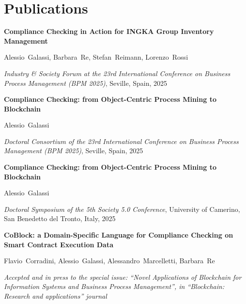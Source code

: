 \section{Publications}

    \begin{onecolentry}
        \textbf{Compliance Checking in Action for INGKA Group Inventory Management}
        
        \mbox{Alessio Galassi}, \mbox{Barbara Re}, \mbox{Stefan Reimann}, \mbox{Lorenzo Rossi}

        \textit{Industry \& Society Forum at the 23rd International Conference on Business Process Management (BPM 2025)}, Seville, Spain, 2025
    \end{onecolentry}

    \abitspace
    
    \begin{onecolentry}
        \textbf{Compliance Checking: from Object-Centric Process Mining to Blockchain}
        
        \mbox{Alessio Galassi}

        \textit{Doctoral Consortium of the 23rd International Conference on Business Process Management (BPM 2025)}, Seville, Spain, 2025
    \end{onecolentry}

     \abitspace
    
    \begin{onecolentry}
        \textbf{Compliance Checking: from Object-Centric Process Mining to Blockchain}
        
        \mbox{Alessio Galassi}

        \textit{Doctoral Symposium of the 5th Society 5.0 Conference}, University of Camerino, San Benedetto del Tronto, Italy, 2025
    \end{onecolentry}

    \abitspace
        
    \begin{onecolentry}
        \textbf{CoBlock: a Domain-Specific Language for Compliance Checking on Smart Contract Execution Data}
        
        \mbox{Flavio Corradini}, \mbox{Alessio Galassi}, \mbox{Alessandro Marcelletti}, \mbox{Barbara Re}

        \textit{Accepted and in press to the special issue: ``Novel Applications of Blockchain for Information Systems and Business Process Management'', in ``Blockchain: Research and applications'' journal}
    \end{onecolentry}


